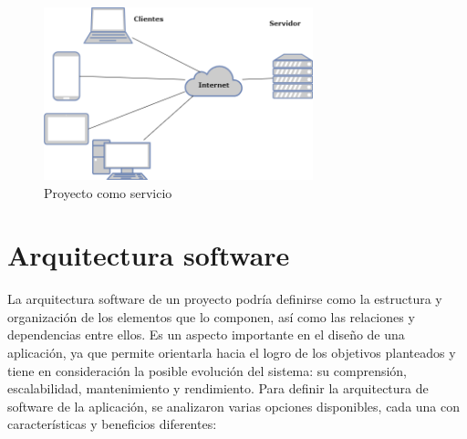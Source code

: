 \begin{figure}[ht!]
    \centering
    \includegraphics[height = 50mm]{imagenes/proyecto_servicio.drawio.png}
    \caption{Proyecto como servicio}
    \label{fig:proyecto_como_servicio}
\end{figure}


\section{Arquitectura software}
La arquitectura software de un proyecto podría definirse como la estructura y organización de los elementos que lo componen, así como las relaciones y dependencias entre ellos. Es un aspecto importante en el diseño de una aplicación, ya que permite orientarla hacia el logro de los objetivos planteados y tiene en consideración la posible evolución del sistema: su comprensión, escalabilidad, mantenimiento y rendimiento\cite{fernandez2006arquitectura}.
Para definir la arquitectura de software de la aplicación, se analizaron varias opciones disponibles, cada una con características y beneficios diferentes\cite{albin2003art}\cite{garimilla2024art}:

